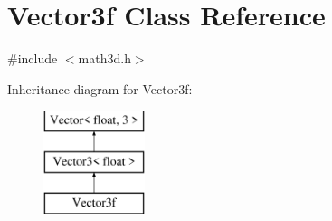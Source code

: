 \hypertarget{class_vector3f}{}\section{Vector3f Class Reference}
\label{class_vector3f}


{\ttfamily \#include $<$math3d.\+h$>$}

Inheritance diagram for Vector3f\+:\begin{figure}[H]
\begin{center}
\leavevmode
\includegraphics[height=3.000000cm]{class_vector3f}
\end{center}
\end{figure}
